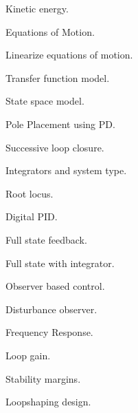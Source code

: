
\par{}
\begin{multicols}{2}
\begin{description}
\setlength{\itemsep}{0pt}
\setlength{\parskip}{0pt}
\item {\bf{}} Kinetic energy.
\item {\bf{}} Equations of Motion.
\item {\bf{}} Linearize equations of motion.
\item {\bf{}} Transfer function model.
\item {\bf{}} State space model.
\item {\bf{}} Pole Placement using PD.
\item {\bf{}} Successive loop closure.
\item {\bf{}} Integrators and system type.
\item {\bf{}} Root locus.
\item {\bf{}} Digital PID.
\item {\bf{}} Full state feedback.
\item {\bf{}} Full state with integrator.
\item {\bf{}} Observer based control.
\item {\bf{}} Disturbance observer.
\item {\bf{}} Frequency Response.
\item {\bf{}} Loop gain.
\item {\bf{}} Stability margins.
\item {\bf{}} Loopshaping design.
\end{description}
\end{multicols}
